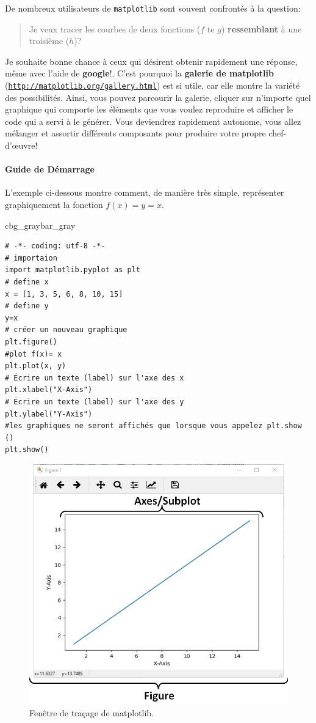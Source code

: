 \documentclass[%
oneside,                 %
final,                   %
10pt,french]{article}
\newenvironment{_pro_tight}[2]{
   \def\FrameCommand{\color{#2}\vrule width 1mm\normalcolor\colorbox{#1}}
   \FrameRule0.6pt\MakeFramed {\advance\hsize-2mm\FrameRestore}\vskip3mm}
   {\vskip0mm\endMakeFramed}
\newenvironment{pro}[2]{
\bgroup\rmfamily
\fboxsep=0mm\relax
\begin{_pro_tight}{#1}{#2}
\list{}{\parsep=-2mm\parskip=0mm\topsep=0pt\leftmargin=2mm
\rightmargin=2\leftmargin\leftmargin=4pt\relax}
\item\relax}
{\endlist\end{_pro_tight}\egroup}
\begin{document}
De nombreux utilisateurs de \texttt{matplotlib} sont souvent confrontés à la question:

\begin{quote}
Je veux tracer les courbes de deux fonctions ($f$ te $g$) \textbf{ressemblant} à une troisième ($h$)?
\end{quote}

 Je souhaite bonne chance à ceux qui désirent obtenir rapidement une réponse, même avec l'aide de \textbf{google}!. C'est pourquoi la \textbf{galerie de matplotlib} (\href{{http://matplotlib.org/gallery.html}}{\nolinkurl{http://matplotlib.org/gallery.html}}) est si utile, car elle montre la variété des possibilités. Ainsi, vous pouvez parcourir la galerie, cliquer sur n'importe quel graphique qui comporte les éléments que vous voulez reproduire et afficher le code qui a servi à le générer. Vous deviendrez rapidement autonome, vous allez mélanger et assortir différents composants pour produire votre propre chef-d’œuvre!

\paragraph{Guide de Démarrage}
L'exemple ci-dessous montre comment, de manière très simple, représenter graphiquement la fonction $f(x) = y = x$.
\begin{pro}{cbg_gray}{bar_gray}\begin{verbatim}
# -*- coding: utf-8 -*-
# importaion
import matplotlib.pyplot as plt
# define x
x = [1, 3, 5, 6, 8, 10, 15]
# define y
y=x
# créer un nouveau graphique
plt.figure()
#plot f(x)= x
plt.plot(x, y)
# Écrire un texte (label) sur l'axe des x
plt.xlabel("X-Axis")
# Écrire un texte (label) sur l'axe des y
plt.ylabel("Y-Axis")
#les graphiques ne seront affichés que lorsque vous appelez plt.show ()
plt.show()
\end{verbatim}
\end{pro}
\noindent


\begin{figure}[!ht]  %
  \centerline{\includegraphics[width=0.7\linewidth]{imgs/BasicPlot1.png}}
  \caption{
  Fenêtre de traçage de matplotlib. \label{fig:BasicPlot1}
  }
\end{figure}
\end{document}
